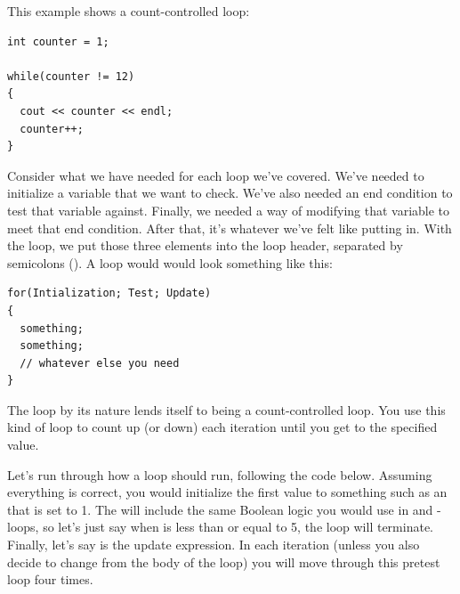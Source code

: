 \noindent This example shows a count-controlled  loop:

\noindent\begin{minipage}{\linewidth}\begin{lstlisting}
int counter = 1;

while(counter != 12)
{
  cout << counter << endl;
  counter++;
}
\end{lstlisting}\end{minipage}


Consider what we have needed for each loop we've covered.
We've needed to initialize a variable that we want to check.
We've also needed an end condition to test that variable against.
Finally, we needed a way of modifying that variable to meet that end condition.
After that, it's whatever we've felt like putting in. With the  loop, we put those three elements into the loop header, separated by semicolons (\Code{;}).
A  loop would would look something like this:

\noindent\begin{minipage}{\linewidth}\begin{lstlisting}
for(Intialization; Test; Update)
{
  something;
  something;
  // whatever else you need
}
\end{lstlisting}\end{minipage}

The  loop by its nature lends itself to being a count-controlled loop.
You use this kind of loop to count up (or down) each iteration until you get to the specified value. 

Let's run through how a  loop should run, following the code below.
Assuming everything is correct, you would initialize the first value to something such as an  that is set to 1.
The  will include the same Boolean logic you would use in  and - loops, so let's just say when  is less than or equal to 5, the loop will terminate.
Finally, let's say   is the update expression.
In each iteration (unless you also decide to change  from the body of the loop) you will move through this pretest loop four times.


